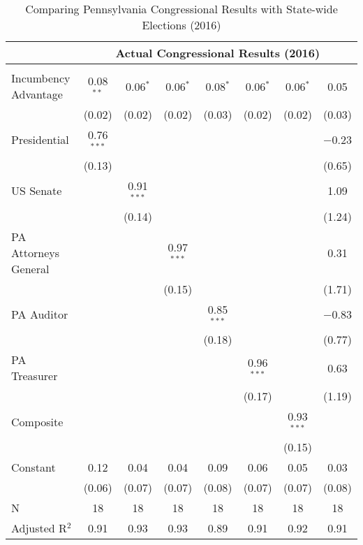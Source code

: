%
\begin{table}[!htbp] \centering 
  \caption{Comparing Pennsylvania Congressional Results with State-wide Elections (2016)} 
  \label{tab:tab_congress_predict} 
\begin{tabular}{@{\extracolsep{0pt}}lccccccc} 
\\[-1.8ex] & \multicolumn{7}{c}{Actual Congressional Results (2016)} \\ 
\hline \\[-1.8ex] 
 Incumbency Advantage & 0.08$^{**}$ & 0.06$^{*}$ & 0.06$^{*}$ & 0.08$^{*}$ & 0.06$^{*}$ & 0.06$^{*}$ & 0.05 \\ 
  & (0.02) & (0.02) & (0.02) & (0.03) & (0.02) & (0.02) & (0.03) \\ 
  Presidential & 0.76$^{***}$ &  &  &  &  &  & $-$0.23 \\ 
  & (0.13) &  &  &  &  &  & (0.65) \\ 
  US Senate &  & 0.91$^{***}$ &  &  &  &  & 1.09 \\ 
  &  & (0.14) &  &  &  &  & (1.24) \\ 
  PA Attorneys General &  &  & 0.97$^{***}$ &  &  &  & 0.31 \\ 
  &  &  & (0.15) &  &  &  & (1.71) \\ 
  PA Auditor &  &  &  & 0.85$^{***}$ &  &  & $-$0.83 \\ 
  &  &  &  & (0.18) &  &  & (0.77) \\ 
  PA Treasurer &  &  &  &  & 0.96$^{***}$ &  & 0.63 \\ 
  &  &  &  &  & (0.17) &  & (1.19) \\ 
  Composite &  &  &  &  &  & 0.93$^{***}$ &  \\ 
  &  &  &  &  &  & (0.15) &  \\ 
  Constant & 0.12 & 0.04 & 0.04 & 0.09 & 0.06 & 0.05 & 0.03 \\ 
  & (0.06) & (0.07) & (0.07) & (0.08) & (0.07) & (0.07) & (0.08) \\ 
 N & 18 & 18 & 18 & 18 & 18 & 18 & 18 \\ 
Adjusted R$^{2}$ & 0.91 & 0.93 & 0.93 & 0.89 & 0.91 & 0.92 & 0.91 \\ 
\end{tabular}
\end{table} 
%
